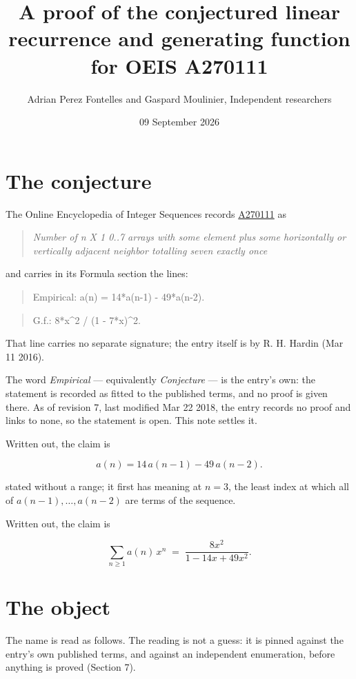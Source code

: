 \documentclass[11pt]{article}
\title{A proof of the conjectured linear recurrence and generating function for OEIS A270111}
\author{Adrian Perez Fontelles and Gaspard Moulinier, Independent researchers}
\date{09 September 2026}
\theoremstyle{definition}
\begin{document}
\maketitle
\section{The conjecture}

The Online Encyclopedia of Integer Sequences records \href{https://oeis.org/A270111}{A270111} as

\begin{quote}\itshape Number of n X 1 0..7 arrays with some element plus some horizontally or vertically adjacent neighbor totalling seven exactly once\end{quote}

and carries in its Formula section the lines:

\begin{quote}\ttfamily Empirical: a(n) = 14*a(n-1) - 49*a(n-2).\end{quote}

\begin{quote}\ttfamily G.f.: 8*x\textasciicircum{}2 / (1 - 7*x)\textasciicircum{}2.\end{quote}

That line carries no separate signature; the entry itself is by R. H. Hardin (Mar 11 2016).

The word {\itshape Empirical} --- equivalently {\itshape Conjecture} --- is the entry's own: the statement is recorded as fitted to the published terms, and no proof is given there. As of revision 7, last modified Mar 22 2018, the entry records no proof and links to none, so the statement is open. This note settles it.

Written out, the claim is

\[a(n) = 14\,a(n-1) - 49\,a(n-2).\]

stated without a range; it first has meaning at $n = 3$, the least index at which all of $a(n-1),\dots,a(n-2)$ are terms of the sequence.

Written out, the claim is

\[\sum_{n \ge 1} a(n)\,x^n \;=\; \frac{8x^{2}}{1 - 14x + 49x^{2}}.\]

\section{The object}

The name is read as follows. The reading is not a guess: it is pinned against the entry's own published terms, and against an independent enumeration, before anything is proved (Section 7).
\end{document}
